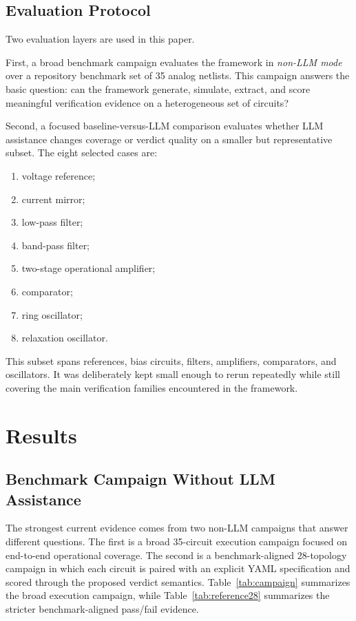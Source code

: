 \documentclass[conference]{IEEEtran}
\begin{document}
\subsection{Evaluation Protocol}
Two evaluation layers are used in this paper.

First, a broad benchmark campaign evaluates the framework in \emph{non-LLM mode} over a repository benchmark set of 35 analog netlists. This campaign answers the basic question: can the framework generate, simulate, extract, and score meaningful verification evidence on a heterogeneous set of circuits?

Second, a focused baseline-versus-LLM comparison evaluates whether LLM assistance changes coverage or verdict quality on a smaller but representative subset. The eight selected cases are:

\begin{enumerate}
\item voltage reference;
\item current mirror;
\item low-pass filter;
\item band-pass filter;
\item two-stage operational amplifier;
\item comparator;
\item ring oscillator;
\item relaxation oscillator.
\end{enumerate}

This subset spans references, bias circuits, filters, amplifiers, comparators, and oscillators. It was deliberately kept small enough to rerun repeatedly while still covering the main verification families encountered in the framework.

\section{Results}
\subsection{Benchmark Campaign Without LLM Assistance}
The strongest current evidence comes from two non-LLM campaigns that answer different questions. The first is a broad 35-circuit execution campaign focused on end-to-end operational coverage. The second is a benchmark-aligned 28-topology campaign in which each circuit is paired with an explicit YAML specification and scored through the proposed verdict semantics. Table~\ref{tab:campaign} summarizes the broad execution campaign, while Table~\ref{tab:reference28} summarizes the stricter benchmark-aligned pass/fail evidence.
\end{document}
